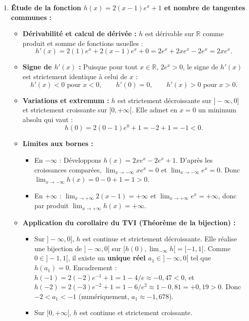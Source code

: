 \documentclass[11pt,a4paper]{article}
\newcommand{\R}{\mathbb{R}}
\begin{document}
\begin{correctionbox}[Exercice 6]
\begin{enumerate}[label=\textbf{\arabic*.}]
    \item \textbf{Étude de la fonction $h(x) = 2(x-1)e^x + 1$ et nombre de tangentes communes :}
    \begin{itemize}
        \item \textbf{Dérivabilité et calcul de dérivée :}
        $h$ est dérivable sur $\R$ comme produit et somme de fonctions usuelles :
        \[
        h'(x) = 2(1)e^x + 2(x-1)e^x + 0 = 2e^x + 2xe^x - 2e^x = 2x e^x.
        \]
        \item \textbf{Signe de $h'(x)$ :}
        Puisque pour tout $x \in \R$, $2e^x > 0$, le signe de $h'(x)$ est strictement identique à celui de $x$ :
        \[
        h'(x) < 0 \text{ pour } x < 0, \qquad h'(0) = 0, \qquad h'(x) > 0 \text{ pour } x > 0.
        \]
        \item \textbf{Variations et extremum :}
        $h$ est strictement décroissante sur $]-\infty, 0]$ et strictement croissante sur $[0, +\infty[$.
        Elle admet en $x = 0$ un minimum absolu qui vaut :
        \[
        h(0) = 2(0 - 1)e^0 + 1 = -2 + 1 = -1 < 0.
        \]
        \item \textbf{Limites aux bornes :}
        \begin{itemize}
            \item En $-\infty$ : Développons $h(x) = 2x e^x - 2e^x + 1$.
            D'après les croissances comparées, $\lim_{x \to -\infty} x e^x = 0$ et $\lim_{x \to -\infty} e^x = 0$.
            Donc $\lim_{x \to -\infty} h(x) = 0 - 0 + 1 = 1 > 0$.
            \item En $+\infty$ : $\lim_{x \to +\infty} 2(x-1) = +\infty$ et $\lim_{x \to +\infty} e^x = +\infty$, donc par produit $\lim_{x \to +\infty} h(x) = +\infty$.
        \end{itemize}
        \item \textbf{Application du corollaire du TVI (Théorème de la bijection) :}
        \begin{itemize}
            \item Sur $]-\infty, 0]$, $h$ est continue et strictement décroissante.
            Elle réalise une bijection de $]-\infty, 0]$ sur $[h(0), \lim_{-\infty} h[ = [-1, 1[$.
            Comme $0 \in ]-1, 1[$, il existe un \textbf{unique réel $a_1 \in ]-\infty, 0[$} tel que $h(a_1) = 0$.
            Encadrement : $h(-1) = 2(-2)e^{-1} + 1 = 1 - 4/e \approx -0{,}47 < 0$, et $h(-2) = 2(-3)e^{-2} + 1 = 1 - 6/e^2 \approx 1 - 0{,}81 = +0{,}19 > 0$.
            Donc $-2 < a_1 < -1$ (numériquement, $a_1 \approx -1{,}678$).
            \item Sur $[0, +\infty[$, $h$ est continue et strictement croissante.

\end{itemize}
\end{itemize}
\end{enumerate}
\end{correctionbox}
\end{document}
